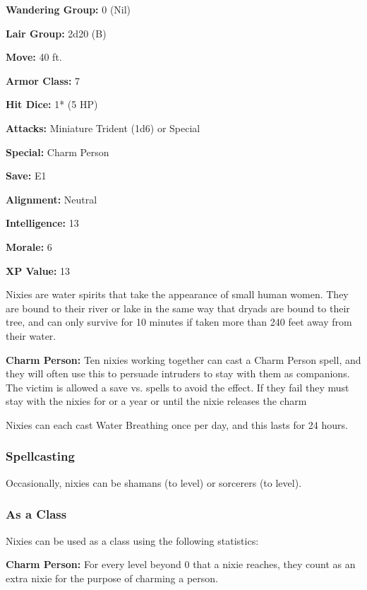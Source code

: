 \begin{multicols*}{2}
{\textbf{Wandering Group:} 0 (Nil)

\textbf{Lair Group:} 2d20 (B)

\textbf{Move:} 40 ft.

\textbf{Armor Class:} 7

\textbf{Hit Dice:} 1* (5 HP)

\textbf{Attacks:} Miniature Trident (1d6) or Special

\textbf{Special:} Charm Person

\textbf{Save:} E1

\textbf{Alignment:} Neutral

\textbf{Intelligence:} 13

\textbf{Morale:} 6

\textbf{XP Value:} 13}

Nixies are water spirits that take the appearance of small human women. They are bound to their river or lake in the same way that dryads are bound to their tree, and can only survive for 10 minutes if taken more than 240 feet away from their water.

\textbf{Charm Person:} Ten nixies working together can cast a Charm Person spell, and they will often use this to persuade intruders to stay with them as companions. The victim is allowed a save vs. spells to avoid the effect. If they fail they must stay with the nixies for or a year or until the nixie releases the charm

Nixies can each cast Water Breathing once per day, and this lasts for 24 hours.

\subsubsection{Spellcasting}
Occasionally, nixies can be shamans (to  level) or sorcerers (to  level).

\subsubsection{As a Class}
Nixies can be used as a class using the following statistics:

\textbf{Charm Person:} For every level beyond 0 that a nixie reaches, they count as an extra nixie for the purpose of charming a person.

\end{multicols*}

